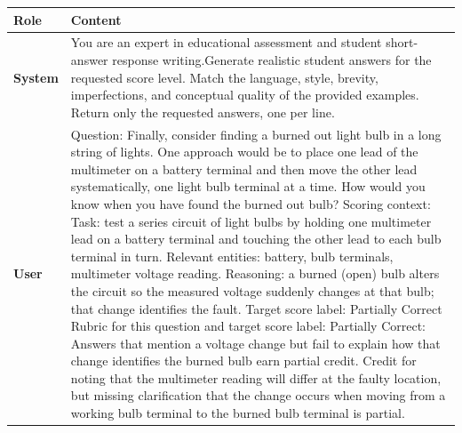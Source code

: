 \begin{table}[t]
    \centering
    \footnotesize
    \renewcommand{\arraystretch}{1.15}
    \begin{tabular}{@{}p{}p{}@{}}
    \hline
    \textbf{Role} & \textbf{Content} \\
    \hline
    \raggedright\textbf{System} &
    \raggedright\ttfamily You are an expert in educational assessment and student short-answer response writing.\newline\newline Generate realistic student answers for the requested score level. Match the language, style, brevity, imperfections, and conceptual quality of the provided examples. Return only the requested answers, one per line. \tabularnewline
    \hline
    \raggedright\textbf{User} &
    \raggedright\ttfamily Question:\newline
    Finally, consider finding a burned out light bulb in a long string of lights. One approach would be to place one lead of the multimeter on a battery terminal and then move the other lead systematically, one light bulb terminal at a time. How would you know when you have found the burned out bulb?\newline\newline
    Scoring context:\newline
    Task: test a series circuit of light bulbs by holding one multimeter lead on a battery terminal and touching the other lead to each bulb terminal in turn. Relevant entities: battery, bulb terminals, multimeter voltage reading. Reasoning: a burned (open) bulb alters the circuit so the measured voltage suddenly changes at that bulb; that change identifies the fault.\newline\newline
    Target score label:\newline
    Partially Correct\newline\newline
    Rubric for this question and target score label:\newline
    Partially Correct: Answers that mention a voltage change but fail to explain how that change identifies the burned bulb earn partial credit. Credit for noting that the multimeter reading will differ at the faulty location, but missing clarification that the change occurs when moving from a working bulb terminal to the burned bulb terminal is partial.\newline\newline

\end{tabular}
\end{table}
